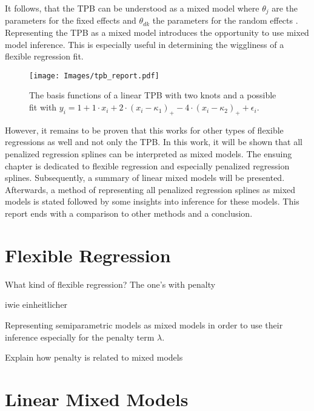 \documentclass[12pt]{article}
\begin{document}
It follows, that the TPB can be understood as a mixed model where $\theta_j$ are the parameters for the fixed effects and $\theta_{dk}$ the parameters for the random effects \cite{ruppert2003semiparametric}. Representing the TPB as a mixed model introduces the opportunity to use mixed model inference. This is especially useful in determining the wiggliness of a flexible regression fit.

\begin{figure}
\begin{center}
\texttt{[image: Images/tpb\_report.pdf]}
\end{center}
\vspace{-2em}
\caption[caption]{The basis functions of a linear TPB with two knots and a possible fit with $y_i = 1 + 1 \cdot x_i +  2 \cdot(x_i-\kappa_1)_+ - 4\cdot (x_i-\kappa_2)_+ + \epsilon_i.$}\label{tpb}
\end{figure}

However, it remains to be proven that this works for other types of flexible regressions as well and not only the TPB. 
In this work, it will be shown that all penalized regression splines can be interpreted as mixed models. The ensuing chapter is dedicated to flexible regression and especially penalized regression splines. Subsequently, a summary of linear mixed models will be presented. Afterwards, a method of representing all penalized regression splines as mixed models is stated followed by some insights into inference for these models. This report ends with a comparison to other methods and a conclusion.


\section{Flexible Regression}

\cite{fahrmeir2013regression}

\cite{kneib2006mixed}

\cite{wood2017generalized}

\cite{wood2011fast}

What kind of flexible regression? The one's with penalty

iwie einheitlicher

Representing semiparametric models as mixed models in order to use their inference especially for the penalty term $\lambda$.

Explain how penalty is related to mixed models


\section{Linear Mixed Models}
\end{document}
